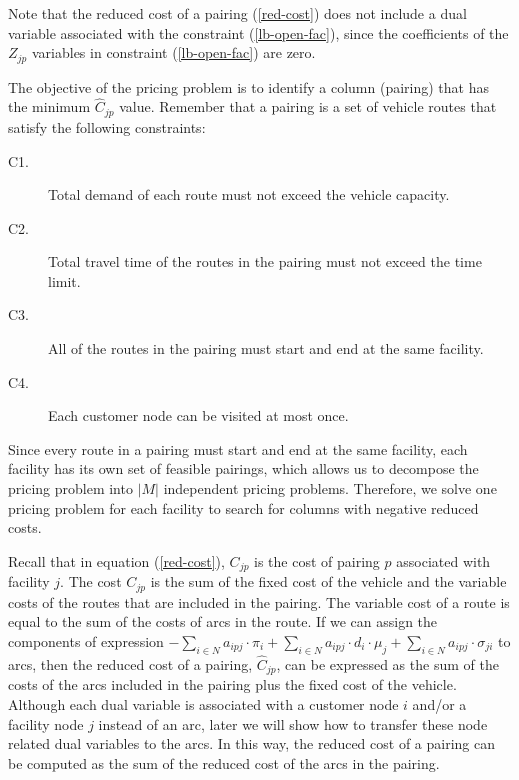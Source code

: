 Note that the reduced cost of a pairing (\ref{red-cost}) does not include a dual 
variable associated with the constraint (\ref{lb-open-fac}), since the coefficients of 
the $Z_{jp}$ variables in constraint (\ref{lb-open-fac}) are zero.

The objective of the pricing problem is to identify a column (pairing) 
that has the minimum $\hat{C}_{jp}$ value. Remember that a pairing is a set 
of vehicle routes that satisfy the following constraints:

\begin{description}
\item [C1.] Total demand of each route must not exceed the vehicle capacity.
\item [C2.] Total travel time of the routes in the pairing  must not exceed the 
time limit.
\item [C3.] All of the routes in the pairing must start and end at the same facility.
\item [C4.] Each customer node can be visited at most once.
\end{description}

Since every route in a pairing must start and end at the same facility, 
each facility has its own set of feasible pairings, which allows us to decompose
the pricing problem into $|M|$ independent pricing problems. Therefore, we solve one 
pricing problem for each facility to search for columns with negative reduced costs. 

Recall that in equation (\ref{red-cost}), $C_{jp}$ is the cost of pairing $p$ associated with 
facility $j$. The cost $C_{jp}$ is the sum of the fixed cost of the vehicle and the variable 
costs of the routes that are included in the pairing. The variable cost of a route is equal to 
the sum of the costs of arcs in the route. If we can assign the components of expression  
$-\sum_{i\in N}a_{ipj} \cdot \pi_{i}+\sum_{i \in N}a_{ipj}\cdot d_{i}\cdot \mu_{j}+\sum_{i \in N}a_{ipj} \cdot \sigma_{ji}$ to arcs, then the reduced cost of a pairing, $\hat{C}_{jp}$, can be expressed as the 
sum of the costs of the arcs included in the pairing plus the fixed cost of the vehicle. 
Although each dual variable is associated with a customer node $i$ and/or a facility node $j$ 
instead of an arc, later  we will show how to transfer these node related dual variables 
to the arcs. In this way, the reduced cost of a pairing can be computed as the sum of the 
reduced cost of the arcs in the pairing.     


